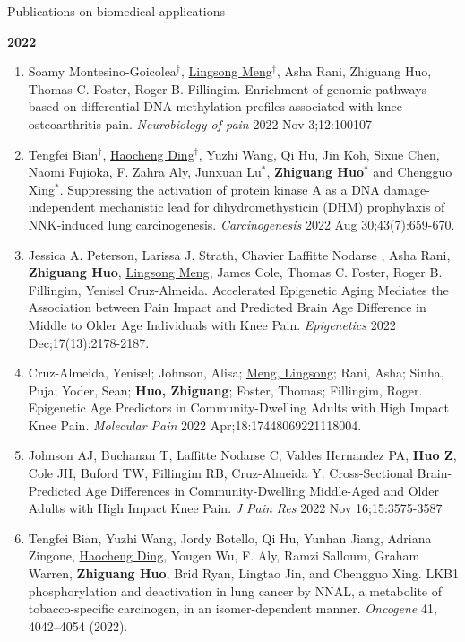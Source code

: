 \documentclass{resume} %
\begin{document}
\begin{rSection}{Publications on biomedical applications}
\begin{enumerate}[noitemsep,topsep=0pt, resume]
\end{enumerate}


\textbf{2022}
\begin{enumerate}[noitemsep,topsep=0pt, resume]


\item Soamy Montesino-Goicolea$^\dagger$, \underline{Lingsong Meng}$^\dagger$, Asha Rani, Zhiguang Huo, Thomas C. Foster, Roger B. Fillingim.
Enrichment of genomic pathways based on differential DNA methylation profiles associated with knee osteoarthritis pain.
\emph{Neurobiology of pain} 2022 Nov 3;12:100107



\item
Tengfei Bian$^\dagger$, \underline{Haocheng Ding}$^\dagger$, Yuzhi Wang, Qi Hu, Jin Koh, Sixue Chen, Naomi Fujioka, F. Zahra Aly, Junxuan Lu$^*$, {\bf Zhiguang Huo}$^*$ and Chengguo Xing$^*$.
Suppressing the activation of protein kinase A as a DNA damage-independent mechanistic lead for dihydromethysticin (DHM) prophylaxis of NNK-induced lung carcinogenesis.
\emph{Carcinogenesis} 2022 Aug 30;43(7):659-670.

\item
Jessica A. Peterson, Larissa J. Strath, Chavier Laffitte Nodarse , Asha Rani, {\bf Zhiguang Huo}, \underline{Lingsong Meng}, James Cole, Thomas C. Foster, Roger B. Fillingim, Yenisel Cruz-Almeida. 
Accelerated Epigenetic Aging Mediates the Association between Pain Impact and Predicted Brain Age Difference in Middle to Older Age Individuals with Knee Pain.  
\emph{Epigenetics} 2022 Dec;17(13):2178-2187.

\item Cruz-Almeida, Yenisel; Johnson, Alisa; \underline{Meng, Lingsong}; Rani, Asha; Sinha, Puja; Yoder, Sean; {\bf Huo, Zhiguang}; Foster, Thomas; Fillingim, Roger.
Epigenetic Age Predictors in Community-Dwelling Adults with High Impact Knee Pain.
\emph{Molecular Pain} 2022 Apr;18:17448069221118004.

\item  
Johnson AJ, Buchanan T, Laffitte Nodarse C, Valdes Hernandez PA, {\bf Huo Z}, Cole JH, Buford TW, Fillingim RB, Cruz-Almeida Y.
Cross-Sectional Brain-Predicted Age Differences in Community-Dwelling Middle-Aged and Older Adults with High Impact Knee Pain. 
\emph{J Pain Res} 2022 Nov 16;15:3575-3587


\item
Tengfei Bian, Yuzhi Wang, Jordy Botello, Qi Hu, Yunhan Jiang, Adriana Zingone, \underline{Haocheng Ding}, Yougen Wu, F. Aly, Ramzi Salloum, Graham Warren, {\bf Zhiguang Huo}, Brid Ryan, Lingtao Jin, and Chengguo Xing. 
LKB1 phosphorylation and deactivation in lung cancer by NNAL, a metabolite of tobacco-specific carcinogen, in an isomer-dependent manner.
\emph{Oncogene} 41, 4042–4054 (2022).


\end{enumerate}
\end{rSection}
\end{document}
